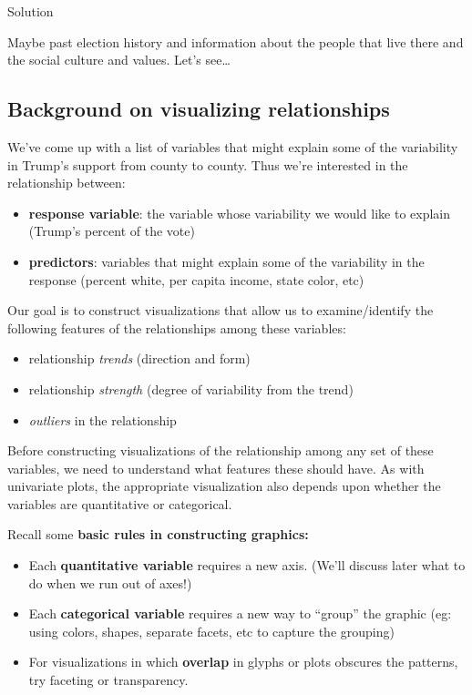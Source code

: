 \documentclass[
  letterpaper,
  DIV=11,
  numbers=noendperiod]{scrreprt}
\providecommand{\tightlist}{%
  \setlength{\itemsep}{0pt}\setlength{\parskip}{0pt}}\usepackage{longtable,booktabs,array}
\begin{document}
Solution

Maybe past election history and information about the people that live
there and the social culture and values. Let's see\ldots{}

\subsection*{Background on visualizing
relationships}\label{background-on-visualizing-relationships}

We've come up with a list of variables that might explain some of the
variability in Trump's support from county to county. Thus we're
interested in the relationship between:

\begin{itemize}
\tightlist
\item
  \textbf{{response variable}}: the variable whose variability we would
  like to explain (Trump's percent of the vote)\\
\item
  \textbf{{predictors}}: variables that might explain some of the
  variability in the response (percent white, per capita income, state
  color, etc)
\end{itemize}

Our goal is to construct visualizations that allow us to
examine/identify the following features of the relationships among these
variables:

\begin{itemize}
\tightlist
\item
  relationship \emph{trends} (direction and form)\\
\item
  relationship \emph{strength} (degree of variability from the trend)\\
\item
  \emph{outliers} in the relationship
\end{itemize}

Before constructing visualizations of the relationship among any set of
these variables, we need to understand what features these should have.
As with univariate plots, the appropriate visualization also depends
upon whether the variables are quantitative or categorical.

Recall some \textbf{basic rules in constructing graphics:}

\begin{itemize}
\tightlist
\item
  Each \textbf{quantitative variable} requires a new axis. (We'll
  discuss later what to do when we run out of axes!)\\
\item
  Each \textbf{categorical variable} requires a new way to ``group'' the
  graphic (eg: using colors, shapes, separate facets, etc to capture the
  grouping)\\
\item
  For visualizations in which \textbf{overlap} in glyphs or plots
  obscures the patterns, try faceting or transparency.
\end{itemize}
\end{document}
